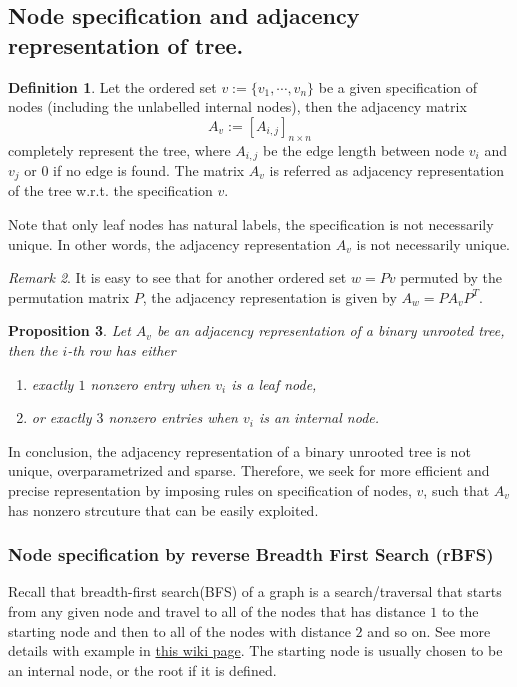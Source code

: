 \documentclass[11pt]{article}
\theoremstyle{definition}
\newtheorem{defn}{Definition}[section]
\theoremstyle{remark}
\newtheorem{remark}[defn]{Remark}
\theoremstyle{plain}
\newtheorem{prop}[defn]{Proposition}
\begin{document}
\subsection{Node specification and adjacency representation of tree.}
\begin{defn}
	Let the ordered set $v := \{v_1,\cdots, v_n\}$ be a given specification of nodes (including the unlabelled internal nodes), then the adjacency matrix 
	\[
		A_v:=[A_{i,j}]_{n\times n}
	\]
	completely represent the tree, where $A_{i,j}$ be the edge length between node $v_i$ and $v_j$ or $0$ if no edge is found. The matrix $A_v$ is referred as adjacency representation of the tree w.r.t. the specification $v$.

	Note that only leaf nodes has natural labels, the specification is not necessarily unique. In other words, the adjacency representation $A_v$ is not necessarily unique.
\end{defn}

\begin{remark}
	It is easy to see that for another ordered set $w = Pv$ permuted by the permutation matrix $P$, the adjacency representation is given by $A_w = PA_vP^T$.
\end{remark}

\begin{prop}
	Let $A_v$ be an adjacency representation of a binary unrooted tree, then the $i$-th row has either 
	\begin{enumerate}
		\item exactly $1$ nonzero entry when $v_i$ is a leaf node,
		\item or exactly $3$ nonzero entries when $v_i$ is an internal node.
	\end{enumerate}
\end{prop}

In conclusion, the adjacency representation of a binary unrooted tree is not unique, overparametrized and sparse. Therefore, we seek for more efficient and precise representation by imposing rules on specification of nodes, $v$, such that $A_v$ has nonzero strcuture that can be easily exploited.

\subsubsection{Node specification by reverse Breadth First Search (rBFS)}

Recall that breadth-first search(BFS) of a graph is a search/traversal that starts from any given node and travel to all of the nodes that has distance $1$ to the starting node and then to all of the nodes with distance $2$ and so on. See more details with example in \href{https://en.wikipedia.org/wiki/Breadth-first_search}{this wiki page}. The starting node is usually chosen to be an internal node, or the root if it is defined. 
\end{document}
